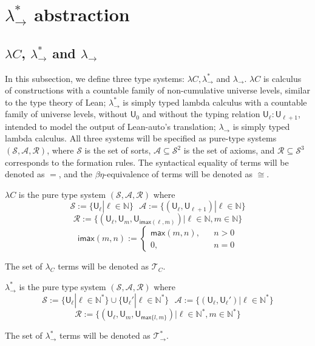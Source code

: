 \section{$\lambda_\to^*$ abstraction}

\subsection{$\lambda C$, $\lambda_\to^*$ and $\lambda_\to$}

In this subsection, we define three type systems: $\lambda C, \lambda_\to^*$ and $\lambda_\to$. $\lambda C$
is calculus of constructions with a countable family of non-cumulative universe levels, similar
to the type theory of Lean; $\lambda_\to^*$ is simply typed lambda calculus with a countable
family of universe levels, without $\mathsf{U}_0$ and without the typing relation
$\mathsf{U}_\ell : \mathsf{U}_{\ell + 1}$, intended to model the output of Lean-auto's translation;
$\lambda_\to$ is simply typed lambda calculus. All three systems will be
specified as pure-type systems $(\mathcal{S}, \mathcal{A}, \mathcal{R})$, where $\mathcal{S}$
is the set of sorts, $\mathcal{A} \subseteq \mathcal{S}^2$ is the set of axioms, and
$\mathcal{R} \subseteq \mathcal{S}^3$ corresponds to the formation rules. The syntactical
equality of terms will be denoted as $=$, and the $\beta\eta$-equivalence of terms will be
denoted as $\cong$.

\begin{definition} $\lambda C$ is the pure type system $(\mathcal{S}, \mathcal{A}, \mathcal{R})$ where
  $$\mathcal{S} := \{\mathsf{U}_\ell | \ell \in \mathbb{N}\} \ \ \ \mathcal{A} := \{(\mathsf{U}_\ell, \mathsf{U}_{\ell + 1}) | \ell \in \mathbb{N}\}$$
  $$\mathcal{R} := \{(\mathsf{U}_\ell, \mathsf{U}_m, \mathsf{U}_{\mathsf{imax}(\ell, m)}) | \ell \in \mathbb{N}, m \in \mathbb{N}\}$$
  $$\mathsf{imax}(m, n) := \left\{\begin{aligned}
    \mathsf{max}(m, n), & & n > 0 \\
    0, & & n = 0
  \end{aligned}\right.$$

  \noindent The set of $\lambda_C$ terms will be denoted as $\mathcal{T}_C$.
\end{definition}

\begin{definition} $\lambda_\to^*$ is the pure type system $(\mathcal{S}, \mathcal{A}, \mathcal{R})$ where
  $$\mathcal{S} := \{\mathsf{U}_\ell | \ell \in \mathbb{N}^*\} \cup \{\mathsf{U}_\ell' | \ell \in \mathbb{N}^*\} \ \ \
    \mathcal{A} := \{(\mathsf{U}_\ell, \mathsf{U}_\ell') | \ell \in \mathbb{N}^*\}$$
  $$\mathcal{R} := \{(\mathsf{U}_\ell, \mathsf{U}_m, \mathsf{U}_{\mathsf{max} \{l, m\}}) | \ell \in \mathbb{N}^*, m \in \mathbb{N}^*\}$$

  \noindent The set of $\lambda_\to^*$ terms will be denoted as $\mathcal{T}_\to^*$.
\end{definition}

